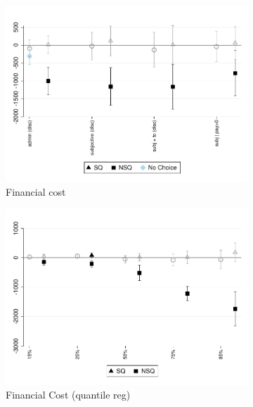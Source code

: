 \documentclass[11pt]{article}
\begin{document}
\begin{figure}[H]
    \caption{The effect of choice between fee-commitment and status quo}
    \label{fc_pro4}
    \begin{center}
    \begin{subfigure}{0.45\textwidth}
        \caption{Financial cost}
        \centering
        \includegraphics[width=\textwidth]{Figuras/fc_te_pro_4.pdf}
    \end{subfigure}
        \begin{subfigure}{0.45\textwidth}
        \caption{Financial Cost (quantile reg)}
        \centering
        \includegraphics[width=\textwidth]{Figuras/fc_quantile_pro_4.pdf}
    \end{subfigure}
    \begin{subfigure}{0.5\textwidth}
    

\end{subfigure}
\end{center}
\end{figure}
\end{document}
